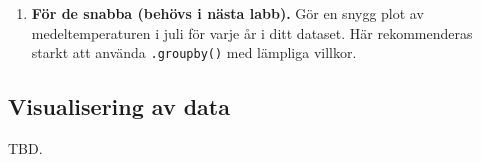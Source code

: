 \documentclass{article}
\begin{document}
\begin{enumerate}
    \item \textbf{För de snabba (behövs i nästa labb).} Gör en snygg plot av medeltemperaturen i juli för varje år i ditt dataset. Här rekommenderas starkt att använda \verb+.groupby()+ med lämpliga villkor. 
\end{enumerate}

\subsection{Visualisering av data}
TBD.
\end{document}
